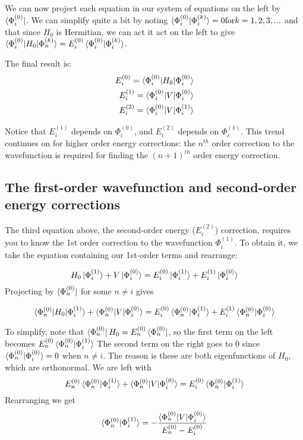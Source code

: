 \documentclass{article}
\newcommand{\Ezero}{E^{(0)}}
\newcommand{\Phizero}{\Phi^{(0)}}
\newcommand{\Eone}{E^{(1)}}
\newcommand{\Phione}{\Phi^{(1)}}
\begin{document}
We can now project each equation in our system of equations on the left by $\bra{\Phi_i^{(0)}}$.
We can simplify quite a bit by noting $\braket{\Phizero_i | \Phi_i^{(k)}} = 0 \space \mathrm{for} \space k = 1,2,3,...$ 
and that since $H_0$ is Hermitian, we can act it act on the left to give 
$ \braket{\Phizero_i | H_0 | \Phi_n^{(k)}   } = \Ezero_i \braket{\Phizero_i | \Phi_i^{(k)}}  $.

The final result is:
\begin{align*}
E_i^{(0)} = \braket{\Phi_i^{(0)} | H_0 | \Phi_i^{(0)}} \\
E_i^{(1)} = \braket{\Phi_i^{(0)} | V | \Phi_i^{(0)}} \\
E_i^{(2)} = \braket{\Phi_i^{(0)} | V | \Phi_i^{(1)}} \\
\end{align*}

Notice that $E_i^{(1)}$ depends on $\Phi_i^{(0)}$, and $E_i^{(2)}$ depends on $\Phi_i^{(1)}$.
This trend continues on for higher order energy corrections: 
    the $n^{th}$ order correction to the wavefunction is required for finding the $(n+1)^{th}$ order energy correction.

\subsection{The first-order wavefunction and second-order energy corrections}
The third equation above, the second-order energy ($E_i^{(2)}$) correction, requires you to know the 1st order correction to the wavefunction $\Phione_i$.
To obtain it, we take the equation containing our 1st-order terms and rearrange:

\[ H_0\ket{\Phione_i} + V \ket{\Phizero_i} = \Ezero_i \ket{\Phione_i} + \Eone_i \ket{\Phizero_i} \]
Projecting by $\bra{\Phizero_n}$ for some $n \neq i$ gives 

\[ \braket{\Phizero_n | H_0 | \Phione_i} + \braket{ \Phizero_n | V | \Phizero_i} = \Ezero_i \braket{\Phizero_n|\Phione_i} + \Eone_i \braket{\Phizero_n | \Phizero_i} \]

To simplify, note that $\bra{\Phizero_n} H_0 = \Ezero_n \bra{\Phizero_n}$, so the first term on the left becomes $\Ezero_n \braket{\Phizero_n | \Phione_i} $
The second term on the right goes to 0 since $\braket{\Phizero_n|\Phizero_i} = 0 $ when $n \neq i$. 
The reason is these are both eigenfunctions of $H_0$, which are orthonormal.
We are left with
\[ \Ezero_n \braket{ \Phizero_n | \Phione_i} + \braket{ \Phizero_n | V | \Phizero_i} = \Ezero_i \braket{ \Phizero_n | \Phione_i }    \]
Rearranging we get
\[ \braket{\Phizero_n | \Phione_i } = -\frac{ \braket{ \Phizero_n | V | \Phizero_i} }{ \Ezero_n - \Ezero_i} \]
\end{document}
